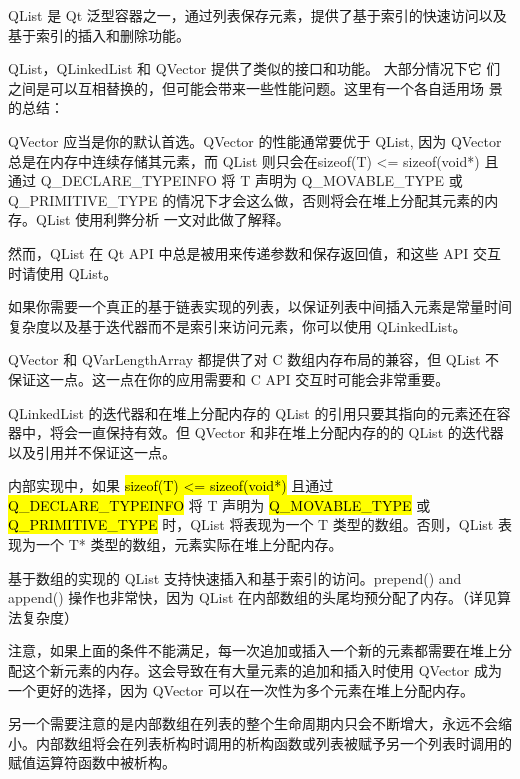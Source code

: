 QList 是 Qt 泛型容器之一，通过列表保存元素，提供了基于索引的快速访问以及基于索引的插入和删除功能。

QList，QLinkedList 和 QVector 提供了类似的接口和功能。 大部分情况下它
们之间是可以互相替换的，但可能会带来一些性能问题。这里有一个各自适用场
景的总结：

\begin{compactitem}

\item QVector 应当是你的默认首选。QVector 的性能通常要优于 QList, 因为 QVector 总是在内存中连续存储其元素，而 QList 则只会在sizeof(T) <= sizeof(void*) 且通过 Q\_DECLARE\_TYPEINFO 将 T 声明为 Q\_MOVABLE\_TYPE 或 Q\_PRIMITIVE\_TYPE 的情况下才会这么做，否则将会在堆上分配其元素的内存。QList 使用利弊分析 一文对此做了解释。
\item    然而，QList 在 Qt API 中总是被用来传递参数和保存返回值，和这些 API 交互时请使用 QList。
\item    如果你需要一个真正的基于链表实现的列表，以保证列表中间插入元素是常量时间复杂度以及基于迭代器而不是索引来访问元素，你可以使用 QLinkedList。

\end{compactitem}

\begin{notice}
QVector 和 QVarLengthArray 都提供了对 C 数组内存布局的兼容，但 QList 不保证这一点。这一点在你的应用需要和 C API 交互时可能会非常重要。
\end{notice}

\begin{notice}
QLinkedList 的迭代器和在堆上分配内存的 QList 的引用只要其指向的元素还在容器中，将会一直保持有效。但 QVector 和非在堆上分配内存的的 QList 的迭代器以及引用并不保证这一点。
\end{notice}

内部实现中，如果 \hl{sizeof(T) <= sizeof(void*)} 且通过 \hl{Q\_DECLARE\_TYPEINFO} 将 T 声明为 \hl{Q\_MOVABLE\_TYPE} 或 \hl{Q\_PRIMITIVE\_TYPE} 时，QList 将表现为一个 T 类型的数组。否则，QList 表现为一个 T* 类型的数组，元素实际在堆上分配内存。

基于数组的实现的 QList 支持快速插入和基于索引的访问。prepend() and append() 操作也非常快，因为 QList 在内部数组的头尾均预分配了内存。（详见算法复杂度）

注意，如果上面的条件不能满足，每一次追加或插入一个新的元素都需要在堆上分配这个新元素的内存。这会导致在有大量元素的追加和插入时使用 QVector 成为一个更好的选择，因为 QVector 可以在一次性为多个元素在堆上分配内存。

另一个需要注意的是内部数组在列表的整个生命周期内只会不断增大，永远不会缩小。内部数组将会在列表析构时调用的析构函数或列表被赋予另一个列表时调用的赋值运算符函数中被析构。

